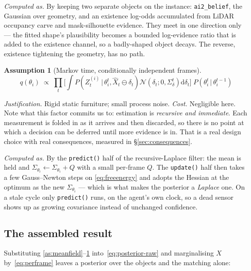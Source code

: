 \documentclass[11pt,a4paper]{report}
\newcommand{\given}{\,|\,}
\theoremstyle{definition}   %
\newtheorem{assumption}{Assumption}
\begin{document}
\smallskip\noindent\textit{Computed as.} By keeping two separate objects on the instance: \texttt{ai2\_belief}, the Gaussian over
geometry, and an existence log-odds accumulated from LiDAR occupancy carve and mask-silhouette
evidence. They meet in one direction only --- the fitted shape's plausibility becomes a bounded
log-evidence ratio that is added to the existence channel, so a badly-shaped object decays. The
reverse, existence tightening the geometry, has no path.

\begin{assumption}[Markov time, conditionally independent frames]\label{as:markov}
\begin{equation}
q(\theta_i)\;\propto\;\prod_t
\Big[\textstyle\int P\!\left(Z_t^{(i)}\given\theta_i^t,\hat X_t\ominus\delta_t\right)
\mathcal{N}\!\left(\delta_t;0,\Sigma_\delta^t\right)\mathrm{d}\delta_t\Big]\;
P\!\left(\theta_i^t\given\theta_i^{t-1}\right)
\end{equation}
\end{assumption}
\noindent\textit{Justification.} Rigid static furniture; small process noise. \textit{Cost.}
Negligible here. Note what this factor commits us to: estimation is \emph{recursive and
immediate}. Each measurement is folded in as it arrives and then discarded, so there is no point
at which a decision can be deferred until more evidence is in. That is a real design choice with
real consequences, measured in \S\ref{sec:consequences}.


\smallskip\noindent\textit{Computed as.} By the \texttt{predict()} half of the recursive-Laplace filter: the mean is held and
$\Sigma_{\theta_i}\!\leftarrow\!\Sigma_{\theta_i}+Q$ with a small per-frame $Q$. The
\texttt{update()} half then takes a few Gauss--Newton steps on \eqref{eq:freeenergy} and adopts
the Hessian at the optimum as the new $\Sigma_{\theta_i}$ --- which is what makes the posterior a
\emph{Laplace} one. On a stale cycle only \texttt{predict()} runs, on the agent's own clock, so a
dead sensor shows up as growing covariance instead of unchanged confidence.

\subsection*{The assembled result}

Substituting \ref{as:meanfield}--\ref{as:markov} into~\eqref{eq:posterior-raw} and marginalising $X$
by~\eqref{eq:perframe} leaves a posterior over the objects and the matching alone:
\end{document}

